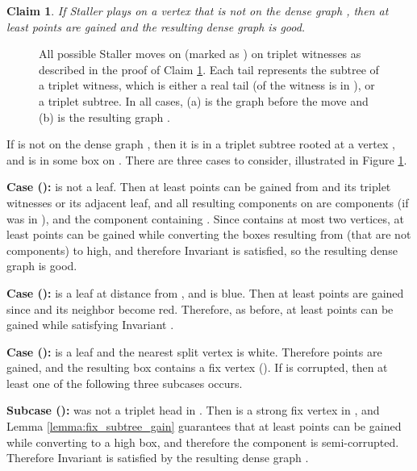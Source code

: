 \documentclass[11pt]{article}
\def\Proof{\par\noindent{\bf Proof:~}}
\newtheorem{claim}[theorem]{Claim}
\theoremstyle{definition}
\begin{document}
\begin{claim}
\label{claim:staller_triplet}
If Staller plays on  a vertex  that is not on the dense graph , then at least  points are gained and the resulting dense graph  is good.
\end{claim}
\begin{figure}[thbp] 
  \caption{\sf All possible Staller moves on  (marked as ) on triplet witnesses as described in the proof of Claim \ref{claim:staller_triplet}.
	Each tail represents the subtree of a triplet witness, which is either a real tail (of the witness is in ), or a triplet subtree. 
	In all cases, (a) is the graph  before the move and (b) is the resulting graph .}
  \medskip
  \centering
  \label{fig:triplet_staller}
\end{figure}
\Proof
If  is not on the dense graph , then it is in a triplet subtree rooted at a vertex , and  is in some box  on .
There are three cases to consider, illustrated in Figure \ref{fig:triplet_staller}.
\bigskip
\par\noindent
{\bf Case ():}
 is not a leaf.
Then at least  points can be gained from  and its triplet witnesses or its adjacent leaf, 
and all resulting components on  are  components (if  was in ), and the component containing .
Since  contains at most two  vertices, at least  points can be gained while converting the boxes resulting from  (that are not  components) to high, 
and therefore Invariant  is satisfied, so the resulting dense graph  is good.

\bigskip
\par\noindent
{\bf Case ():}
 is a leaf at distance  from , and  is blue.
Then at least  points are gained since  and its neighbor become red. Therefore, as before,
at least  points can be gained while satisfying Invariant .

\bigskip
\par\noindent
{\bf Case ():}
 is a leaf and the nearest split vertex  is white.
Therefore  points are gained, and the resulting box  contains a fix vertex ().
If  is corrupted, then at least one of the following three subcases occurs.

\smallskip
\par\noindent
{\bf Subcase ():}
 was not a triplet head in . Then  is a strong fix vertex in , and Lemma \ref{lemma:fix_subtree_gain} guarantees that at least  
points can be gained while converting  to a high box, and therefore the component is semi-corrupted. Therefore Invariant  is satisfied by the resulting dense graph .
\end{document}
